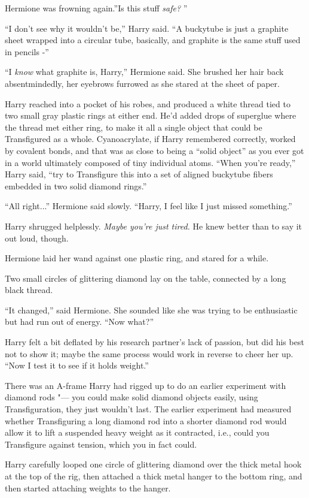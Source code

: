 Hermione was frowning again.''Is this stuff \emph{safe?} ''

``I don't see why it wouldn't be,'' Harry said. ``A buckytube is just a
graphite sheet wrapped into a circular tube, basically, and graphite is
the same stuff used in pencils -''

``I \emph{know} what graphite is, Harry,'' Hermione said. She brushed her
hair back absentmindedly, her eyebrows furrowed as she stared at the
sheet of paper.

Harry reached into a pocket of his robes, and produced a white thread
tied to two small gray plastic rings at either end. He'd added drops of
superglue where the thread met either ring, to make it all a single
object that could be Transfigured as a whole. Cyanoacrylate, if Harry
remembered correctly, worked by covalent bonds, and that was as close to
being a ``solid object'' as you ever got in a world ultimately composed
of tiny individual atoms. ``When you're ready,'' Harry said, ``try to
Transfigure this into a set of aligned buckytube fibers embedded in two
solid diamond rings.''

``All right...'' Hermione said slowly. ``Harry, I feel like I just
missed something.''

Harry shrugged helplessly. \emph{Maybe you're just tired.} He knew
better than to say it out loud, though.

Hermione laid her wand against one plastic ring, and stared for a while.

Two small circles of glittering diamond lay on the table, connected by a
long black thread.

``It changed,'' said Hermione. She sounded like she was trying to be
enthusiastic but had run out of energy. ``Now what?''

Harry felt a bit deflated by his research partner's lack of passion, but
did his best not to show it; maybe the same process would work in
reverse to cheer her up. ``Now I test it to see if it holds weight.''

There was an A-frame Harry had rigged up to do an earlier experiment
with diamond rods "--- you could make solid diamond objects easily, using
Transfiguration, they just wouldn't last. The earlier experiment had
measured whether Transfiguring a long diamond rod into a shorter diamond
rod would allow it to lift a suspended heavy weight as it contracted,
i.e., could you Transfigure against tension, which you in fact could.

Harry carefully looped one circle of glittering diamond over the thick
metal hook at the top of the rig, then attached a thick metal hanger to
the bottom ring, and then started attaching weights to the hanger.

